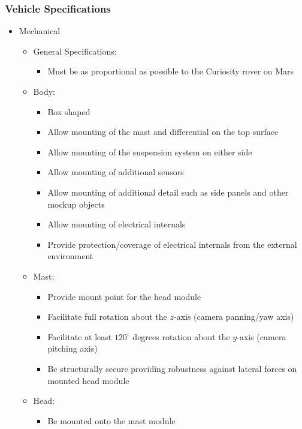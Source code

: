     \subsubsection{Vehicle Specifications}
      \begin{itemize}
        \item Mechanical
        \begin{itemize}
          \item General Specifications:
          \begin{itemize}
            \item Must be as proportional as possible to the Curiosity rover on Mars
          \end{itemize}
          \item Body:
          \begin{itemize}
            \item Box shaped
            \item Allow mounting of the mast and differential on the top surface
            \item Allow mounting of the suspension system on either side
            \item Allow mounting of additional sensors
            \item Allow mounting of additional detail such as side panels and other mockup objects
            \item Allow mounting of electrical internals
            \item Provide protection/coverage of electrical internals from the external environment
          \end{itemize}
          \item Mast:
          \begin{itemize}
            \item Provide mount point for the head module
            \item Facilitate full rotation about the $z$-axis (camera panning/yaw axis)
            \item Facilitate at least $120^\circ$ degrees rotation about the $y$-axis (camera pitching axis)
            \item Be structurally secure providing robustness against lateral forces on mounted head module
          \end{itemize}
          \item Head:
          \begin{itemize}
            \item Be mounted onto the mast module

\end{itemize}
\end{itemize}
\end{itemize}
